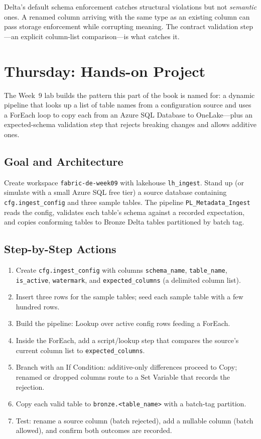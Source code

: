 \begin{pitfall}
Delta's default schema enforcement catches structural violations but not \emph{semantic} ones. A renamed column arriving with the same type as an existing column can pass storage enforcement while corrupting meaning. The contract validation step---an explicit column-list comparison---is what catches it.
\end{pitfall}

\section{Thursday: Hands-on Project}
The Week~9 lab builds the pattern this part of the book is named for: a dynamic pipeline that looks up a list of table names from a configuration source and uses a ForEach loop to copy each from an Azure SQL Database to OneLake---plus an expected-schema validation step that rejects breaking changes and allows additive ones.

\subsection{Goal and Architecture}
Create workspace \texttt{fabric-de-week09} with lakehouse \texttt{lh\_ingest}. Stand up (or simulate with a small Azure SQL free tier) a source database containing \texttt{cfg.ingest\_config} and three sample tables. The pipeline \texttt{PL\_Metadata\_Ingest} reads the config, validates each table's schema against a recorded expectation, and copies conforming tables to Bronze Delta tables partitioned by batch tag.

\subsection{Step-by-Step Actions}
\begin{enumerate}
    \item Create \texttt{cfg.ingest\_config} with columns \texttt{schema\_name}, \texttt{table\_name}, \texttt{is\_active}, \texttt{watermark}, and \texttt{expected\_columns} (a delimited column list).
    \item Insert three rows for the sample tables; seed each sample table with a few hundred rows.
    \item Build the pipeline: Lookup over active config rows feeding a ForEach.
    \item Inside the ForEach, add a script/lookup step that compares the source's current column list to \texttt{expected\_columns}.
    \item Branch with an If Condition: additive-only differences proceed to Copy; renamed or dropped columns route to a Set Variable that records the rejection.
    \item Copy each valid table to \texttt{bronze.<table\_name>} with a batch-tag partition.
    \item Test: rename a source column (batch rejected), add a nullable column (batch allowed), and confirm both outcomes are recorded.
\end{enumerate}

